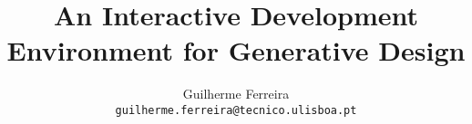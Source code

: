 \documentclass[runningheads,a4paper]{llncs2e/llncs}
\begin{document}
\title{An Interactive Development Environment for Generative Design}
\author{Guilherme Ferreira \\ \texttt{guilherme.ferreira@tecnico.ulisboa.pt}}

\maketitle










\newpage
\appendix


% 
% 
 

 
\end{document}
